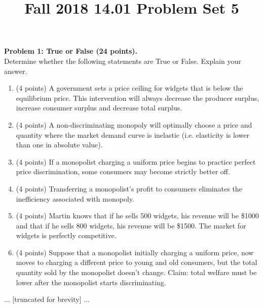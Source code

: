 \documentclass{article}
\title{Fall 2018 14.01 Problem Set 5}
\date{}
\begin{document}
\maketitle

\noindent\textbf{Problem 1: True or False (24 points).} \\
Determine whether the following statements are True or False. Explain your answer. 

\begin{enumerate}
\item (4 points) A government sets a price ceiling for widgets that is below the equilibrium price. This intervention will always decrease the producer surplus, increase consumer surplus and decrease total surplus. 

\item (4 points) A non-discriminating monopoly will optimally choose a price and quantity where the market demand curve is inelastic (i.e. elasticity is lower than one in absolute value).

\item (4 points) If a monopolist charging a uniform price begins to practice perfect price discrimination, some consumers may become strictly better off.

\item (4 points) Transferring a monopolist’s profit to consumers eliminates the inefficiency associated with monopoly.

\item (4 points) Martin knows that if he sells 500 widgets, his revenue will be \$1000 and that if he sells 800 widgets, his revenue will be \$1500. The market for widgets is perfectly competitive.

\item (4 points) Suppose that a monopolist initially charging a uniform price, now moves to charging a different price to young and old consumers, but the total quantity sold by the monopolist doesn’t change. Claim: total welfare must be lower after the monopolist starts discriminating. 
\end{enumerate}

\begin{flushleft}
... [truncated for brevity] ...
\end{flushleft}
\end{document}
